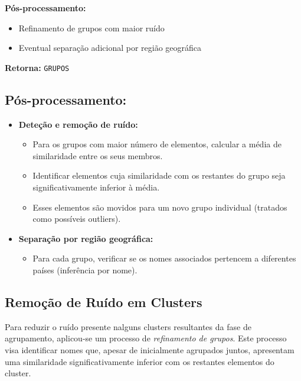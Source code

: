 \documentclass[a4paper,12pt]{article}
\begin{document}
\vspace{0.5em}
\noindent\textbf{Pós-processamento:}
\begin{itemize}
    \item Refinamento de grupos com maior ruído
    \item Eventual separação adicional por região geográfica
\end{itemize}

\vspace{0.5em}
\noindent\textbf{Retorna:} \texttt{GRUPOS}

\subsection{Pós-processamento:}
\begin{itemize}
    \item \textbf{Deteção e remoção de ruído:}
    \begin{itemize}
        \item Para os grupos com maior número de elementos, calcular a média de similaridade entre os seus membros.
        \item Identificar elementos cuja similaridade com os restantes do grupo seja significativamente inferior à média.
        \item Esses elementos são movidos para um novo grupo individual (tratados como possíveis outliers).
    \end{itemize}
    
    \item \textbf{Separação por região geográfica:}
    \begin{itemize}
        \item Para cada grupo, verificar se os nomes associados pertencem a diferentes países (inferência por nome).
    \end{itemize}
\end{itemize}

\subsection{Remoção de Ruído em Clusters}

Para reduzir o ruído presente nalguns clusters resultantes da fase de agrupamento, aplicou-se um processo de \textit{refinamento de grupos}. Este processo visa identificar nomes que, apesar de inicialmente agrupados juntos, apresentam uma similaridade significativamente inferior com os restantes elementos do cluster.
\end{document}
